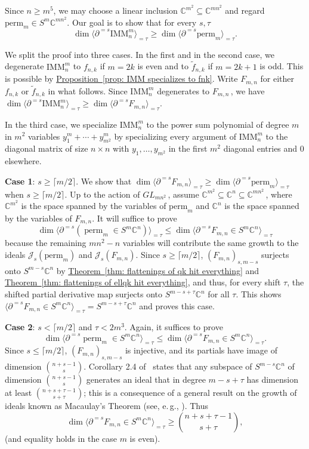 \documentclass[11pt]{article}
\numberwithin{equation}{section}
\theoremstyle{definition}
\theoremstyle{plain}
\newcommand{\eg}{e.\,g.}
\newcommand{\expref}[2]{\hyperref[#2]{#1~\ref{#2}}}
\newcommand{\vvirg}{ , \dots , }
\newcommand{\calJ}{\mathcal{J}}
\newcommand{\bbC}{\mathbb{C}}
\renewcommand{\tilde}[1]{\widetilde{#1}}
\newcommand{\perm}{\mathrm{perm}}
\def\BC{\mathbb C}
\def\t{\tau}
\def\tperm{\operatorname{perm}}
\def\tdim{\operatorname{dim}}
\newcommand{\IMM}{\mathrm{IMM}}
\begin{document}
Since $ n \geq m^5$, we may choose a linear inclusion $\BC^{m^2}\subseteq \BC^{mn^2}$ and regard   $\perm_m\in S^m \bbC^{mn^2}$. Our goal is to show that for every $s,\tau$
\[
\dim \langle \partial^{=s} \IMM^m_n \rangle_{=\tau} \geq \dim \langle \partial^{=s} \perm_m \rangle_{=\tau}.
\]

We split the proof into three cases. In the first and in the second case, we degenerate $\IMM^m_n$ to $f_{n,k}$ if $m=2k$ is even and to $\tilde{f}_{n,k}$ if $m=2k+1$ is odd. This is possible by \expref{Proposition}{prop: IMM specializes to fnk}. Write $F_{m,n}$ for either $f_{n,k}$ or $\tilde f_{n,k}$ in what follows. Since $\IMM^m_n$ degenerates to $F_{m,n}$\,, we have $\dim \langle \partial^{=s} \IMM^m_n \rangle_{=\tau} \geq \dim \langle \partial^{=s} F_{m,n} \rangle_{=\tau}$. 

In the third case, we specialize $\IMM^m_n$ to the power sum polynomial of degree $m$ in $m^2$ variables $y_1^{m} + \cdots + y_{m^2}^m$ by specializing every argument of $\IMM^m_n$ to the diagonal matrix of size $n \times n$ with $y_1 \vvirg y_{m^2}$ in the first $m^2$ diagonal entries and $0$ elsewhere.
 

{\bf Case 1}:  $s \geq \lceil {m}/{2}\rceil $. We show that $\dim \langle \partial^{=s} F_{m,n} \rangle_{=\tau} \geq \dim \langle \partial^{=s} \perm_m \rangle_{=\tau}$ when $s\geq\lceil m/2\rceil$. Up to the action of $GL_{mn^2}$\,, assume $\bbC^{m^2} \subseteq \bbC^n \subseteq \bbC^{mn^2}$\,, where $\bbC^{m^2}$ is the space spanned by the variables of $\perm_m$ and $\bbC^n$ is the space spanned by the variables of $F_{m,n}$. It will suffice to prove
\[
  \tdim  \langle \partial^{=s}(\tperm_m \in S^m\BC^{n})\rangle_{=\t}\leq \tdim  \langle \partial^{=s}F_{m,n} \in S^m\BC^{n}\rangle_{=\t}
\]
because the remaining $mn^2-n$ variables will contribute the same
growth to the ideals $\calJ_s(\perm_m)$ and $\calJ_s(F_{m,n})$. Since
$s\geq \lceil {m}/{2}\rceil$, $(F_{m,n})_{s, m-s}$ surjects onto
$S^{m-s} \bbC^n$ by \expref{Theorem}{thm: flattenings of qk hit
  everything} and \expref{Theorem}{thm: flattenings of ellqk hit
  everything}, and thus, for every shift $\tau$, the shifted partial
derivative map surjects onto $S^{ m-s +\t} \BC^n$ for all $\t$. This
shows
$\langle \partial^{=s}F_{m,n} \in S^m\BC^{n}\rangle_{=\t} = S^{ m-s
  +\t}\BC^n$ and proves this case.
 

{\bf Case 2}: $s <\lceil m/2\rceil $ and $\t< 2m^3$. Again, it suffices to prove
\[
  \tdim  \langle \partial^{=s} \tperm_m\in S^m\BC^{n} \rangle_{=\t}\leq \tdim  \langle \partial^{=s}F_{m,n} \in  S^m\BC^{n} \rangle_{=\t}.
\]
Since $s \leq \lceil m/2 \rceil$, $(F_{m,n})_{s,m-s}$ is injective,
and its partials have image of dimension $\binom{n+s-1}{s}$. Corollary
2.4 of~\cite{2016arXiv160902103E} states that any subspace of
$S^{m-s}\BC^n$ of dimension $\binom{n+s-1}s$ generates an ideal that
in degree $m-s+\t$ has dimension at least $\binom {n+s+\t-1}{s+\t}$;
this is a consequence of a general result on the growth of ideals
known as Macaulay's Theorem (see, \eg,
\cite{Stan:HilbertFunGradedAlgebras}). Thus
$$
 \tdim  \langle \partial^{=s}F_{m,n} \in  S^m\BC^{n} \rangle_{=\t} \geq \binom {n+s+\t-1}{s+\t},
$$
(and equality holds in the case $m$ is even).
\end{document}
